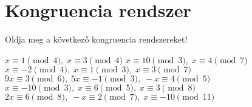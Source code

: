 \documentclass[a4paper,12pt]{article}
\theoremstyle{definition}
\begin{document}
	\section{Kongruencia rendszer}
	\begin{question}
		Oldja meg a következő kongruencia rendszereket!
		\begin{tasks}
			\task $ x \equiv 1 \pmod 4,\; x \equiv 3 \pmod 4$
			\task $ x \equiv 10 \pmod 3,\; x \equiv 4 \pmod 7$
			\task $ x \equiv -2 \pmod 4,\; x \equiv 1 \pmod 3,\; x \equiv 3 \pmod 7$
			\task $ 9x \equiv 3 \pmod 6,\; 5x \equiv -1 \pmod 3,\; -x \equiv 4 \pmod 5$
			\task $ x \equiv -10 \pmod 3,\; x \equiv 6 \pmod 5,\; x \equiv 3 \pmod 8$
			\task $ 2x \equiv 6 \pmod 8,\; -x \equiv 2 \pmod 7,\; x \equiv -10 \pmod{11}$
		\end{tasks}
	\end{question}
\end{document}
